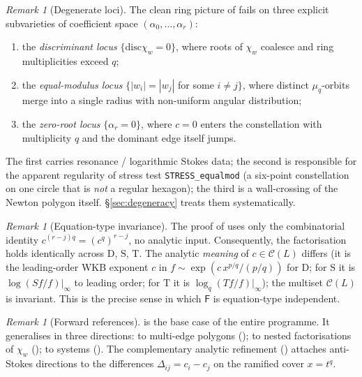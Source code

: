 \documentclass[11pt,a4paper]{article}
\theoremstyle{plain}
\theoremstyle{definition}
\theoremstyle{remark}
\newtheorem{remark}[theorem]{Remark}
\newcommand{\opD}{\mathrm{D}}                     %
\newcommand{\opS}{\mathrm{S}}                     %
\newcommand{\opT}{\mathrm{T}}                     %
\newcommand{\Cl}{\mathcal{C}}
\newcommand{\Fclass}{\mathsf{F}}
\newcommand{\disc}{\mathrm{disc}}
\newcommand{\Dij}{\Delta_{ij}}
\begin{document}
\begin{remark}[Degenerate loci]\label{rem:degenerate}
The clean ring picture of  fails on three explicit
subvarieties of coefficient space $(\alpha_0, \dots, \alpha_r)$:
\begin{enumerate}[label=(\roman*)]
\item the \emph{discriminant locus} $\{\disc \chi_w = 0\}$, where roots of
      $\chi_w$ coalesce and ring multiplicities exceed $q$;
\item the \emph{equal-modulus locus} $\{|w_i| = |w_j|$ for some $i \ne j\}$,
      where distinct $\mu_q$-orbits merge into a single radius with
      non-uniform angular distribution;
\item the \emph{zero-root locus} $\{\alpha_r = 0\}$, where $c = 0$ enters
      the constellation with multiplicity $q$ and the dominant edge itself
      jumps.
\end{enumerate}
The first carries resonance / logarithmic Stokes data; the second is
responsible for the apparent regularity of stress test
\texttt{STRESS\_equalmod} (a six-point constellation on one circle that is
\emph{not} a regular hexagon); the third is a wall-crossing of the Newton
polygon itself. \S\ref{sec:degeneracy} treats them systematically.
\end{remark}

\begin{remark}[Equation-type invariance]\label{rem:eq-invariance}
The proof of  uses only the combinatorial identity
$c^{(r-j)q} = (c^q)^{r-j}$, no analytic input. Consequently, the
factorisation holds identically across $\opD$, $\opS$, $\opT$. The analytic
\emph{meaning} of $c \in \Cl(L)$ differs (it is the leading-order WKB
exponent $c$ in $f \sim \exp(c\, x^{p/q}/(p/q))$ for $\opD$; for $\opS$ it
is $\log(S f / f)|_\infty$ to leading order; for $\opT$ it is
$\log_q(T f / f)|_\infty$); the multiset $\Cl(L)$ is invariant. This is
the precise sense in which $\Fclass$ is equation-type independent.
\end{remark}

\begin{remark}[Forward references]\label{rem:forward-main}
 is the base case of the entire programme. It generalises
in three directions: to multi-edge polygons (); to nested
factorisations of $\chi_w$ (); to systems ().
The complementary analytic refinement
() attaches anti-Stokes directions
to the differences $\Dij = c_i - c_j$ on the ramified cover $x = t^q$.
\end{remark}
\end{document}
